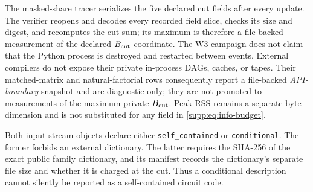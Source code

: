 \begin{remark}
\label{rem:observable-boundary-accounting}
The masked-share tracer serializes the five declared cut fields after every
update.  The verifier reopens and decodes every recorded field slice, checks
its size and digest, and recomputes the cut sum; its maximum is therefore a
file-backed measurement of the declared $B_{\rm cut}$ coordinate.  The W3
campaign does not claim that the Python process is destroyed and restarted
between events.  External compilers do not expose their private in-process DAGs,
caches, or tapes.  Their matched-matrix and natural-factorial rows consequently
report a file-backed \emph{API-boundary} snapshot and are diagnostic only; they
are not promoted to measurements of the maximum private $B_{\rm cut}$.  Peak
RSS remains a separate byte dimension and is not substituted for any field in
\eqref{supp:eq:info-budget}.
\end{remark}

\begin{remark}
\label{rem:dictionary-accounting-code}
Both input-stream objects declare either \texttt{self\_contained} or
\texttt{conditional}.  The former forbids an external dictionary.  The latter
requires the SHA-256 of the exact public family dictionary, and its manifest
records the dictionary's separate file size and whether it is charged at the
cut.  Thus a conditional description cannot silently be reported as a
self-contained circuit code.
\end{remark}
